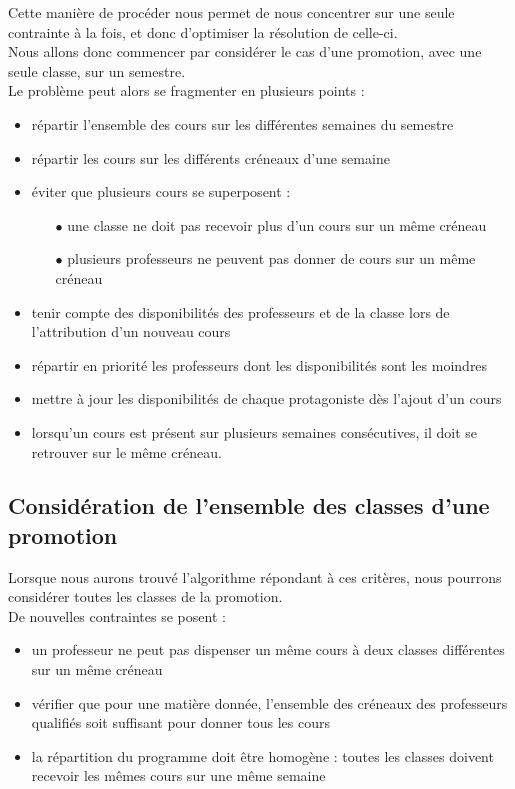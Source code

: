 \documentclass[12pt,a4paper,french]{article}
\begin{document}
Cette manière de procéder nous permet de nous concentrer sur une seule contrainte à la fois, et donc d'optimiser la résolution de celle-ci.\\

Nous allons donc commencer par considérer le cas d'une promotion, avec une seule classe, sur un semestre.\\

Le problème peut alors se fragmenter en plusieurs points :
\begin{itemize}
\item répartir l'ensemble des cours sur les différentes semaines du semestre
\item répartir les cours sur les différents créneaux d'une semaine
\item éviter que plusieurs cours se superposent : 
	\begin{itemize} 
	\item[$\bullet$] une classe ne doit pas recevoir plus d'un cours sur un même créneau
	\item[$\bullet$] plusieurs professeurs ne peuvent pas donner de cours sur un même créneau
	\end{itemize}
\item tenir compte des disponibilités des professeurs et de la classe lors de l'attribution d'un nouveau cours
\item répartir en priorité les professeurs dont les disponibilités sont les moindres
\item mettre à jour les disponibilités de chaque protagoniste dès l'ajout d'un cours
\item lorsqu'un cours est présent sur plusieurs semaines consécutives, il doit se retrouver sur le même créneau.
\end {itemize}

\subsection{Considération de l'ensemble des classes d'une promotion}
Lorsque nous aurons trouvé l'algorithme répondant à ces critères, nous pourrons considérer toutes les classes de la promotion.\\

De nouvelles contraintes se posent :
\begin{itemize}
\item un professeur ne peut pas dispenser un même cours à deux classes différentes sur un même créneau
\item vérifier que pour une matière donnée, l'ensemble des créneaux des professeurs qualifiés soit suffisant pour donner tous les cours
\item la répartition du programme doit être homogène : toutes les classes doivent recevoir les mêmes cours sur une même semaine
\end{itemize}
\end{document}
